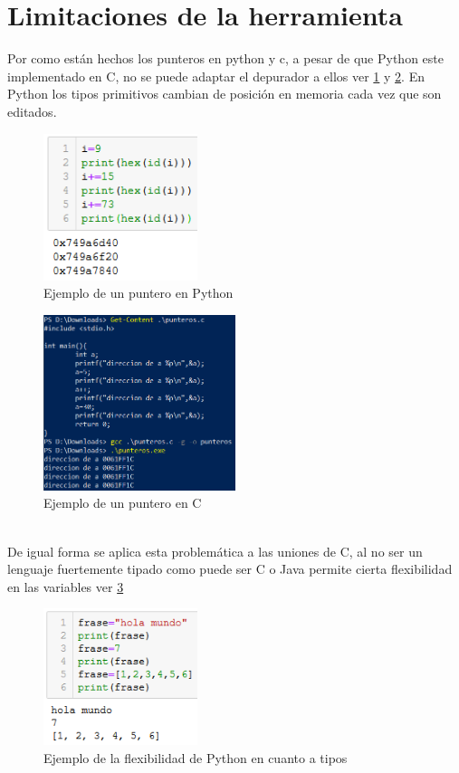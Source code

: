 \section{Limitaciones de la herramienta}
Por como están hechos los punteros en python y c, a pesar de que Python este implementado en C, no se puede adaptar el depurador a ellos ver \ref{fig:punteros1} y \ref{fig:punteros2}.
En Python los tipos primitivos cambian de posición en memoria cada vez que son editados.
\begin{figure}[ht]
\centering
\includegraphics[width=0.4\textwidth]{img/punterosP1.png}
\caption{Ejemplo de un puntero en Python}
\label{fig:punteros1}
\end{figure}
\begin{figure}[ht]
\centering
\includegraphics[width=0.5\textwidth]{img/punterosC1.png}
\caption{Ejemplo de un puntero en C}
\label{fig:punteros2}
\end{figure}
\\

De igual forma se aplica esta problemática a las uniones de C, al no ser un lenguaje fuertemente tipado como puede ser C o Java permite cierta flexibilidad en las variables ver \ref{fig:unions1}
\begin{figure}[ht]
\centering
\includegraphics[width=0.4\textwidth]{img/unionesP.png}
\caption{Ejemplo de la flexibilidad de Python en cuanto a tipos}
\label{fig:unions1}
\end{figure}
\\

